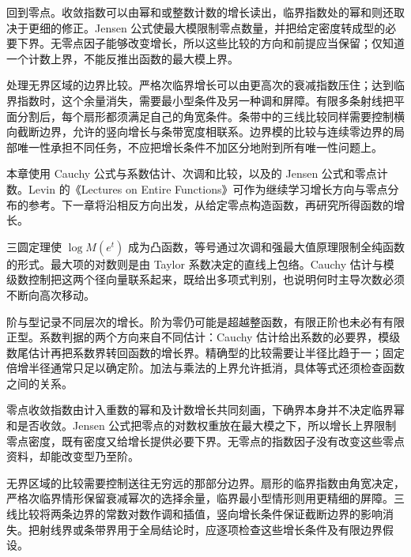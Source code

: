 \ProseParagraphBreak
{}回到零点。收敛指数可以由幂和或整数计数的增长读出，临界指数处的幂和则还取决于更细的修正。Jensen 公式使最大模限制零点数量，并把给定密度转成型的必要下界。无零点因子能够改变增长，所以这些比较的方向和前提应当保留；仅知道一个计数上界，不能反推出函数的最大模上界。

\ProseParagraphBreak
{}处理无界区域的边界比较。严格次临界增长可以由更高次的衰减指数压住；达到临界指数时，这个余量消失，需要最小型条件及另一种调和屏障。有限多条射线把平面分割后，每个扇形都须满足自己的角宽条件。条带中的三线比较同样需要控制横向截断边界，允许的竖向增长与条带宽度相联系。边界模的比较与连续零边界的局部唯一性承担不同任务，不应把增长条件不加区分地附到所有唯一性问题上。

\ProseParagraphBreak
本章使用 Cauchy 公式与系数估计、次调和比较，以及的 Jensen 公式和零点计数。Levin 的《Lectures on Entire Functions》\cite{Levin1996Lectures}可作为继续学习增长方向与零点分布的参考。下一章将沿相反方向出发，从给定零点构造函数，再研究所得函数的增长。






\begin{chaptersummary}
三圆定理使 \(\log M(e^t)\) 成为凸函数，等号通过次调和强最大值原理限制全纯函数的形式。最大项的对数则是由 Taylor 系数决定的直线上包络。Cauchy 估计与模级数控制把这两个径向量联系起来，既给出多项式判别，也说明何时主导次数必须不断向高次移动。

\ProseParagraphBreak
阶与型记录不同层次的增长。阶为零仍可能是超越整函数，有限正阶也未必有有限正型。系数判据的两个方向来自不同估计：Cauchy 估计给出系数的必要界，模级数尾估计再把系数界转回函数的增长界。精确型的比较需要让半径比趋于一；固定倍增半径通常只足以确定阶。加法与乘法的上界允许抵消，具体等式还须检查函数之间的关系。

\ProseParagraphBreak
零点收敛指数由计入重数的幂和及计数增长共同刻画，下确界本身并不决定临界幂和是否收敛。Jensen 公式把零点的对数权重放在最大模之下，所以增长上界限制零点密度，既有密度又给增长提供必要下界。无零点的指数因子没有改变这些零点资料，却能改变型乃至阶。

\ProseParagraphBreak
无界区域的比较需要控制送往无穷远的那部分边界。扇形的临界指数由角宽决定，严格次临界情形保留衰减幂次的选择余量，临界最小型情形则用更精细的屏障。三线比较将两条边界的常数对数作调和插值，竖向增长条件保证截断边界的影响消失。把射线界或条带界用于全局结论时，应逐项检查这些增长条件及有限边界假设。
\end{chaptersummary}

